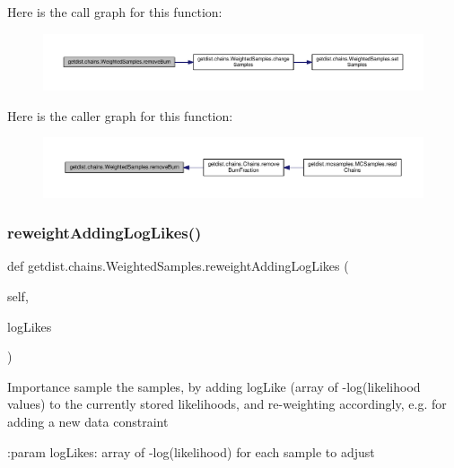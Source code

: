 Here is the call graph for this function\+:
\nopagebreak
\begin{figure}[H]
\begin{center}
\leavevmode
\includegraphics[width=350pt]{classgetdist_1_1chains_1_1WeightedSamples_abebbaf7a369f8cbe63df082ba39969bb_cgraph}
\end{center}
\end{figure}
Here is the caller graph for this function\+:
\nopagebreak
\begin{figure}[H]
\begin{center}
\leavevmode
\includegraphics[width=350pt]{classgetdist_1_1chains_1_1WeightedSamples_abebbaf7a369f8cbe63df082ba39969bb_icgraph}
\end{center}
\end{figure}
\mbox{\label{classgetdist_1_1chains_1_1WeightedSamples_a92b26d5dd4a59044bcf0977deb5a77df}} 
\subsubsection{\texorpdfstring{reweight\+Adding\+Log\+Likes()}{reweightAddingLogLikes()}}
{\footnotesize\ttfamily def getdist.\+chains.\+Weighted\+Samples.\+reweight\+Adding\+Log\+Likes (\begin{DoxyParamCaption}\item[{}]{self,  }\item[{}]{log\+Likes }\end{DoxyParamCaption})}

\begin{DoxyVerb}Importance sample the samples, by adding logLike (array of -log(likelihood values) to the currently stored likelihoods,
and re-weighting accordingly, e.g. for adding a new data constraint

:param logLikes: array of -log(likelihood) for each sample to adjust
\end{DoxyVerb}
 

